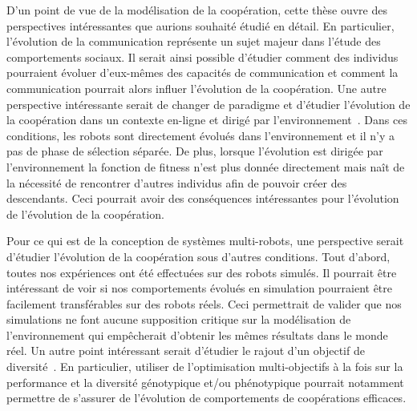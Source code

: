 		D'un point de vue de la modélisation de la coopération, cette thèse ouvre des perspectives intéressantes que aurions souhaité étudié en détail. En particulier, l'évolution de la communication représente un sujet majeur dans l'étude des comportements sociaux. Il serait ainsi possible d'étudier comment des individus pourraient évoluer d'eux-mêmes des capacités de communication et comment la communication pourrait alors influer l'évolution de la coopération. Une autre perspective intéressante serait de changer de paradigme et d'étudier l'évolution de la coopération dans un contexte en-ligne et dirigé par l'environnement~\parencite{Montanier2011, Montanier2013}. Dans ces conditions, les robots sont directement évolués dans l'environnement et il n'y a pas de phase de sélection séparée. De plus, lorsque l'évolution est dirigée par l'environnement la fonction de fitness n'est plus donnée directement mais naît de la nécessité de rencontrer d'autres individus afin de pouvoir créer des descendants. Ceci pourrait avoir des conséquences intéressantes pour l'évolution de l'évolution de la coopération.

		Pour ce qui est de la conception de systèmes multi-robots, une perspective serait d'étudier l'évolution de la coopération sous d'autres conditions. Tout d'abord, toutes nos expériences ont été effectuées sur des robots simulés. Il pourrait être intéressant de voir si nos comportements évolués en simulation pourraient être facilement transférables sur des robots réels. Ceci permettrait de valider que nos simulations ne font aucune supposition critique sur la modélisation de l'environnement qui empêcherait d'obtenir les mêmes résultats dans le monde réel. Un autre point intéressant serait d'étudier le rajout d'un objectif de diversité~\parencite{Lehman2008, Doncieux2014}. En particulier, utiliser de l'optimisation multi-objectifs à la fois sur la performance et la diversité génotypique et/ou phénotypique pourrait notamment permettre de s'assurer de l'évolution de comportements de coopérations efficaces.